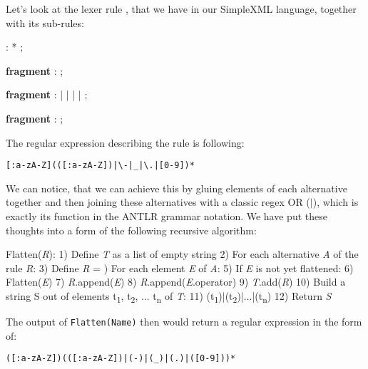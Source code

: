 \pagebreak

Let's look at the lexer rule , that we have in our SimpleXML language, together with its sub-rules:

\begin{antlr}
	         :    * ;

	\textbf{fragment}
	        :   \regex{[0-9]} ;

	\textbf{fragment}
	     :   
             |   \literal{-} | \literal{{\_}} | 
             |   
             ;

	\textbf{fragment}
	:   \regex{[:a-zA-Z]} ;
\end{antlr}

The regular expression describing the  rule is following:

\begin{center}
	\texttt{[:a-zA-Z](([:a-zA-Z])|\textbackslash-|{\_}|\textbackslash.|[0-9])*}
\end{center}

We can notice, that we can achieve this by gluing elements of each alternative together and then joining these alternatives with a classic regex OR ($|$), which is exactly its function in the ANTLR grammar notation.
We have put these thoughts into a form of the following recursive algorithm:

\begin{antlr}
	Flatten(\textit{R}):
	1) Define \textit{T} as a list of empty string
	2) For each alternative \textit{A} of the rule \textit{R}:
	3)     Define \textit{R} = \ap{})     For each element \textit{E} of \textit{A}:
	5)         If \textit{E} is not yet flattened:
	6)             Flatten(\textit{E})
	7)         \textit{R}.append(\textit{E})
	8)         \textit{R}.append(\textit{E}.operator)
	9)     \textit{T}.add(\textit{R})
	10) Build a string S out of elements t\textsubscript{1}, t\textsubscript{2}, ... t\textsubscript{n} of \textit{T}:
	11)     (t\textsubscript{1})|(t\textsubscript{2})|...|(t\textsubscript{n})
	12) Return \textit{S}
\end{antlr}

The output of \texttt{Flatten(Name)} then would return a regular expression in the form of:

\begin{center}
	\texttt{([:a-zA-Z])(([:a-zA-Z])|(-)|({\_})|(.)|([0-9]))*}
\end{center}

